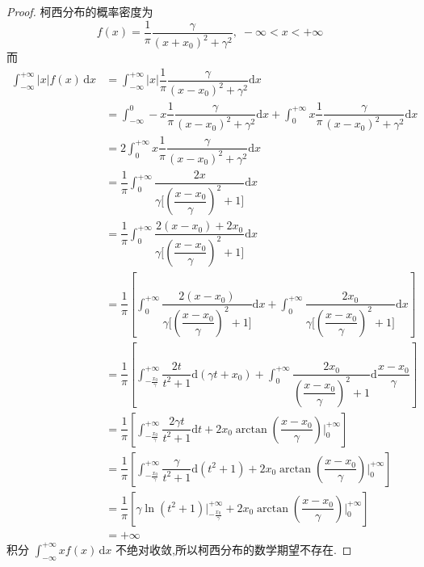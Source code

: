 \begin{proof}
    柯西分布的概率密度为
    $$
    f(x) = \dfrac{1}{\pi} \dfrac{\gamma}{(x + x_0)^2 + \gamma^2},\; -\infty < x < +\infty
    $$
    而
    $$
    \begin{aligned}
        \int_{-\infty}^{+\infty} |x| f(x)\,\text{d}x &= \int_{-\infty}^{+\infty} |x| \dfrac{1}{\pi} \dfrac{\gamma}{(x - x_0)^2 + \gamma^2} \text{d}x \\
        &= \int_{-\infty}^{0} -x \dfrac{1}{\pi} \dfrac{\gamma}{(x - x_0)^2 + \gamma^2} \text{d}x + \int_{0}^{+\infty} x \dfrac{1}{\pi} \dfrac{\gamma}{(x - x_0)^2 + \gamma^2} \text{d}x \\
        &= 2 \int_{0}^{+\infty} x \dfrac{1}{\pi} \dfrac{\gamma}{(x - x_0)^2 + \gamma^2} \text{d}x \\
        &= \dfrac{1}{\pi} \int_{0}^{+\infty} \dfrac{2x}{\gamma \big[(\dfrac{x - x_0}{\gamma})^2 + 1 \big]} \text{d}x \\
        &= \dfrac{1}{\pi} \int_{0}^{+\infty} \dfrac{2(x - x_0) + 2x_0}{\gamma \big[(\dfrac{x - x_0}{\gamma})^2 + 1 \big]} \text{d}x \\
        &= \dfrac{1}{\pi} \left[ \int_{0}^{+\infty} \dfrac{2(x - x_0)}{\gamma \big[ (\dfrac{x - x_0}{\gamma})^2 + 1 \big]} \text{d}x + \int_{0}^{+\infty} \dfrac{2x_0}{\gamma \big[(\dfrac{x - x_0}{\gamma})^2 + 1 \big]} \text{d}x \right] \\
        &= \dfrac{1}{\pi} \left[ \int_{-\frac{x_0}{\gamma}}^{+\infty} \dfrac{2t}{t^2 + 1} \text{d}(\gamma t + x_0) + \int_{0}^{+\infty} \dfrac{2x_0}{(\dfrac{x - x_0}{\gamma})^2 + 1} \text{d} \dfrac{x - x_0}{\gamma} \right] \\
        &= \dfrac{1}{\pi} \left[ \int_{-\frac{x_0}{\gamma}}^{+\infty} \dfrac{2 \gamma t}{t^2 + 1} \text{d}t + 2x_0 \arctan(\dfrac{x - x_0}{\gamma}) \Big|_0^{+\infty} \right] \\
        &= \dfrac{1}{\pi} \left[ \int_{-\frac{x_0}{\gamma}}^{+\infty} \dfrac{\gamma}{t^2 + 1} \text{d} (t^2 + 1) + 2x_0 \arctan(\dfrac{x - x_0}{\gamma}) \Big|_0^{+\infty} \right] \\
        &= \dfrac{1}{\pi} \left[ \gamma \ln(t^2 + 1) \Big|_{-\frac{x_0}{\gamma}}^{+\infty} + 2x_0 \arctan(\dfrac{x - x_0}{\gamma}) \Big|_0^{+\infty} \right] \\
        &= +\infty
    \end{aligned}
    $$
    积分 $\displaystyle\int_{-\infty}^{+\infty} x f(x)\,\text{d}x$ 不绝对收敛,所以柯西分布的数学期望不存在.
\end{proof}


